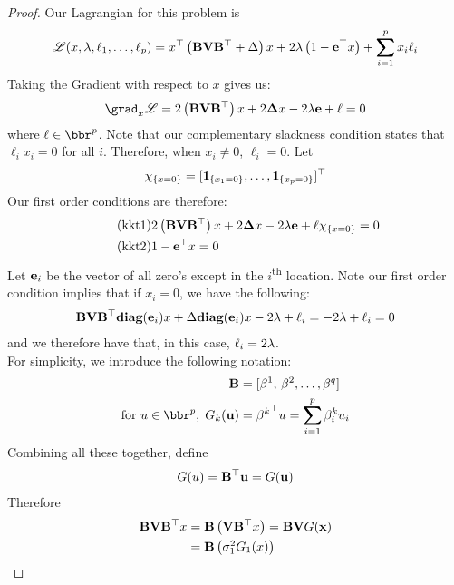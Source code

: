 \documentclass[12pt,leqno,letterpaper]{article}
\begin{document}
\begin{proof}
Our Lagrangian for this problem is
\begin{align}
\lscr(x,\gl,\ell_1, \ldots, \ell_p) = x^\T \paren{\mat{BVB^\T} +\Gd}x + 2 \gl\paren{1-\be^\T x} +\sum_{i=1}^p x_i \ell_i 
\end{align}
Taking the Gradient with respect to $x$ gives us:
\begin{align}
\grad_x \lscr = 2\paren{\mat{BVB^\T}}x + 2 \mat{\Gd}x - 2 \gl \be + \ell = 0
\end{align}
where $\ell \in \bbr^p$.  Note that our complementary slackness condition states that $\ell_i x_i =0$ for all $i$.  Therefore, when $x_i \neq 0$, $\ell_i=0$.  Let 
\begin{align*}
\chi_{\{x = 0\}} = [\mathbf{1}_{ \hspace{-0.5pt} {\{x_1 = 0\}} }, \ldots , \mathbf{1}_{ \hspace{-0.5pt} {\{x_p = 0\}} }]^\top
\end{align*}
Our first order conditions are therefore:
\begin{align}
\label{kkt1} \tag{kkt1}&\begin{aligned}
 2\left(\mathbf{BVB^\top}\right)x +  2\mathbf{\Delta}x - 2 \lambda \mathbf{e} + \ell \chi_{\{x = 0\}}=0
 \end{aligned}\\
\label{kkt2} \tag{kkt2}&1 - \mathbf{e}^\top x = 0
\end{align}
Let $\mathbf{e}_i$ be the vector of all zero's except in the $i$\textsuperscript{th} location.  Note our first order condition implies that if $x_i = 0$, we have the following:
\begin{align}
\mathbf{BVB^\top}\textbf{diag}(\mathbf{e}_i)x +  \Delta \textbf{diag}(\mathbf{e}_i)x - 2\lambda + \ell_i = -2\lambda + \ell_i =0
\end{align} 
and we therefore have that, in this case, $\ell_i = 2 \lambda$.\\  For simplicity, we introduce the following notation:
\begin{align*}
\mat{B} &= [ \gb^1, \, \gb^2, \ldots, \gb^q]\\ 
\text{for } u \in \bbr^p, \; G_k(\mat{u}) &=  {\gb^k}^\T u = \sum_{i=1}^p \gb^k_i u_i
\end{align*}
Combining all these together, define
\begin{align}
G(u) = \mathbf{B^\top u} = G(\mathbf{u})
\end{align}
Therefore
\begin{align}
\mathbf{BVB^\top}x &= \mathbf{B}\left(\mathbf{VB^\top}x\right) = \mathbf{BV}G(\mathbf{x})\\
&=\mathbf{B} \begin{pmatrix}
\sigma_1^2 G_1(x) \\

\end{pmatrix}
\end{align}
\end{proof}
\end{document}
